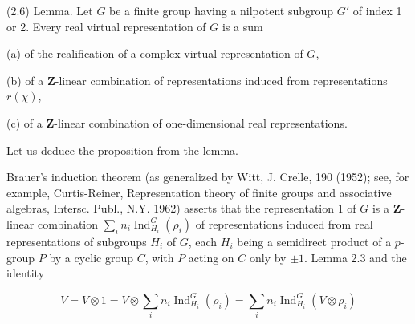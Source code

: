 \documentclass[9pt,twoside]{extarticle}
\begin{document}
{(2.6) Lemma. Let \(G\) be a finite group having a nilpotent subgroup \(G'\) of index 1 or 2. Every real virtual representation of \(G\) is a sum\par

(a) of the realification of a complex virtual representation of \(G\),\par

(b) of a \(\mathbf Z\)-linear combination of representations induced from representations \(r(\chi)\),\par

(c) of a \(\mathbf Z\)-linear combination of one-dimensional real representations.\par

Let us deduce the proposition from the lemma.\par

Brauer’s induction theorem (as generalized by Witt, J. Crelle, 190 (1952); see, for example, Curtis-Reiner, Representation theory of finite groups and associative algebras, Intersc. Publ., N.Y. 1962) asserts that the representation 1 of \(G\) is a \(\mathbf Z\)-linear combination \(\sum_i n_i\operatorname{Ind}_{H_i}^G(\rho_i)\) of representations induced from real representations of subgroups \(H_i\) of \(G\), each \(H_i\) being a semidirect product of a \(p\)-group \(P\) by a cyclic group \(C\), with \(P\) acting on \(C\) only by \(\pm1\). Lemma 2.3 and the identity\par

\[
V=V\otimes1=V\otimes\sum_i n_i\operatorname{Ind}_{H_i}^G(\rho_i)=\sum_i n_i\operatorname{Ind}_{H_i}^G(V\otimes\rho_i)
\]
}
\end{document}
